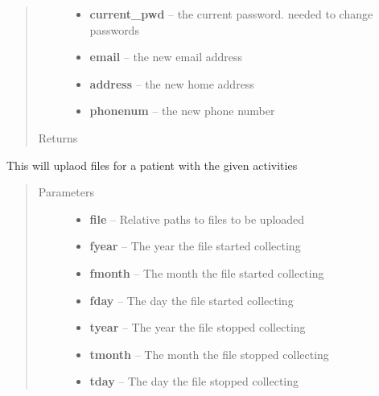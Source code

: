 \documentclass[letterpaper,10pt,english]{sphinxmanual}
\begin{document}
\begin{fulllineitems}
\begin{fulllineitems}
\begin{quote}
\begin{description}
\begin{itemize}
\item {} 
\textbf{current\_pwd} -- the current password. needed to change passwords

\item {} 
\textbf{email} -- the new email address

\item {} 
\textbf{address} -- the new home address

\item {} 
\textbf{phonenum} -- the new phone number

\end{itemize}

\item[{Returns}] \leavevmode


\end{description}\end{quote}

\end{fulllineitems}


\begin{fulllineitems}
\label{STD/WebUI:WebUI.WebUI.WebUI.upload_files}
This will uplaod files for a patient with the given activities
\begin{quote}\begin{description}
\item[{Parameters}] \leavevmode\begin{itemize}
\item {} 
\textbf{file} -- Relative paths to files to be uploaded

\item {} 
\textbf{fyear} -- The year the file started collecting

\item {} 
\textbf{fmonth} -- The month the file started collecting

\item {} 
\textbf{fday} -- The day the file started collecting

\item {} 
\textbf{tyear} -- The year the file stopped collecting

\item {} 
\textbf{tmonth} -- The month the file stopped collecting

\item {} 
\textbf{tday} -- The day the file stopped collecting


\end{itemize}
\end{description}
\end{quote}
\end{fulllineitems}
\end{fulllineitems}
\end{document}
